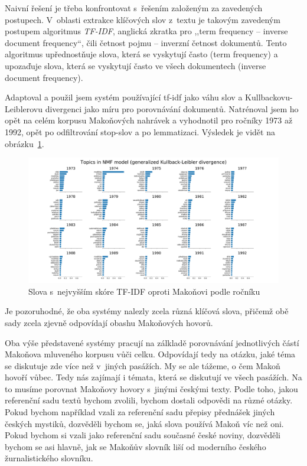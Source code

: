 Naivní řešení je třeba konfrontovat s~řešením založeným za zavedených postupech.
V~oblasti extrakce klíčových slov z~textu je takovým zavedeným postupem
algoritmus \textit{TF-IDF}\cite{Beel2016-11Resea-32348}, anglická zkratka pro
,,term frequency -- inverse document frequency``, čili četnost pojmu -- inverzní
četnost dokumentů. Tento algoritmus upřednostňuje slova, která se vyskytují
často (term frequency) a upozaďuje slova, která se vyskytují často ve všech
dokumentech (inverse document frequency).

Adaptoval a použil jsem systém používající tf-idf jako váhu slov a
Kullbackovu-Leiblerovu divergenci jako míru pro porovnávání dokumentů.
Natrénoval jsem ho opět na celém korpusu Makoňových nahrávek a vyhodnotil pro
ročníky 1973 až 1992, opět po odfiltrování stop-slov a po lemmatizaci. Výsledek
je vidět na obrázku~\ref{fig:topic-by-year-kld}.

\begin{figure}[htpb]
\includegraphics[scale=0.32, angle=90]{rc/topics-by-year-kld.pdf}
\caption{Slova s~nejvyšším skóre TF-IDF oproti Makoňovi podle ročníku}
\label{fig:topic-by-year-kld}
\end{figure}

Je pozoruhodné, že oba systémy nalezly zcela různá klíčová slova, přičemž obě
sady zcela zjevně odpovídají obashu Makoňových hovorů.

Oba výše představené systémy pracují na zálkladě porovnávání jednotlivých částí
Makoňova mluveného korpusu vůči celku. Odpovídají tedy na otázku, jaké téma se
diskutuje zde více než v~jiných pasážích. My se ale tážeme, o čem Makoň hovoří
vůbec. Tedy nás zajímají i témata, která se diskutují ve všech pasážích. Na to
musíme porovnat Makoňovy hovory s~jinými českými texty. Podle toho, jakou
referenční sadu textů bychom zvolili, bychom dostali odpovědi na různé otázky.
Pokud bychom například vzali za referenční sadu přepisy přednášek jiných českých
mystiků, dozvěděli bychom se, jaká slova používá Makoň víc než oni. Pokud bychom
si vzali jako referenční sadu současné české noviny, dozvěděli bychom se asi
hlavně, jak se Makoňův slovník liší od moderního českého žurnalistického
slovníku.

